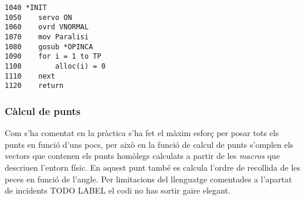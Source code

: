 \begin{verbatim}
1040 *INIT
1050    servo ON
1060    ovrd VNORMAL
1070    mov Paralisi
1080    gosub *OPINCA
1090    for i = 1 to TP
1100        alloc(i) = 0
1110    next
1120    return
\end{verbatim}

\subsubsection{Càlcul de punts}
Com s'ha comentat en la pràctica s'ha fet el màxim esforç per posar tots els punts en funció d'uns pocs,
per això en la funció de calcul de punts s'omplen els vectors que contenen els punts homòlegs calculats
a partir de les \emph{macros} que descriuen l'entorn físic. En aquest punt també es calcula l'ordre
de recollida de les peces en funció de l'angle. Per limitacions del llenguatge comentades a l'apartat
de incidents TODO LABEL el codi no has sortir gaire elegant.

